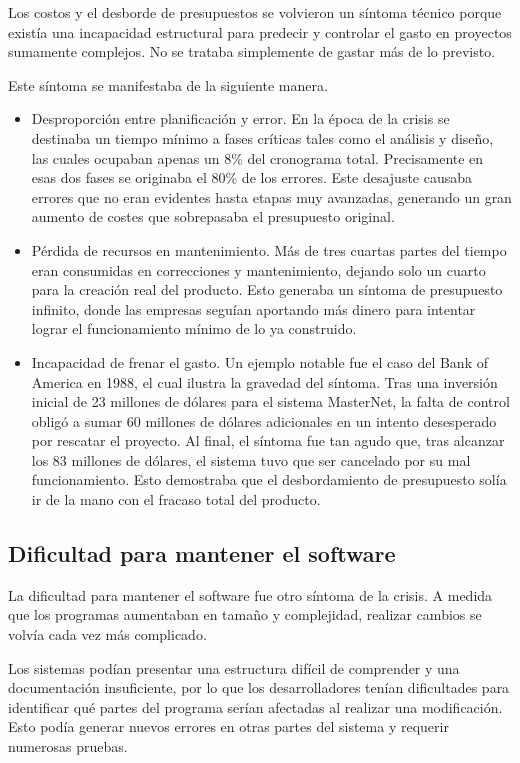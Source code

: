 \documentclass{./plantilla/umss}
\begin{document}
Los costos y el desborde de presupuestos se volvieron un síntoma técnico porque existía una incapacidad estructural para predecir y controlar el gasto en proyectos sumamente complejos. No se trataba simplemente de gastar más de lo previsto.

Este síntoma se manifestaba de la siguiente manera.

\begin{itemize}
    \item Desproporción entre planificación y error. En la época de la crisis se destinaba un tiempo mínimo a fases críticas tales como el análisis y diseño, las cuales ocupaban apenas un 8\% del cronograma total. Precisamente en esas dos fases se originaba el 80\% de los errores. Este desajuste causaba errores que no eran evidentes hasta etapas muy avanzadas, generando un gran aumento de costes que sobrepasaba el presupuesto original.
    \item Pérdida de recursos en mantenimiento. Más de tres cuartas partes del tiempo eran consumidas en correcciones y mantenimiento, dejando solo un cuarto para la creación real del producto. Esto generaba un síntoma de presupuesto infinito, donde las empresas seguían aportando más dinero para intentar lograr el funcionamiento mínimo de lo ya construido.
    \item Incapacidad de frenar el gasto. Un ejemplo notable fue el caso del Bank of America en 1988, el cual ilustra la gravedad del síntoma. Tras una inversión inicial de 23 millones de dólares para el sistema MasterNet, la falta de control obligó a sumar 60 millones de dólares adicionales en un intento desesperado por rescatar el proyecto. Al final, el síntoma fue tan agudo que, tras alcanzar los 83 millones de dólares, el sistema tuvo que ser cancelado por su mal funcionamiento. Esto demostraba que el desbordamiento de presupuesto solía ir de la mano con el fracaso total del producto.
\end{itemize}

\subsection{Dificultad para mantener el software}

La dificultad para mantener el software fue otro síntoma de la crisis. A medida que los programas aumentaban en tamaño y complejidad, realizar cambios se volvía cada vez más complicado.

Los sistemas podían presentar una estructura difícil de comprender y una documentación insuficiente, por lo que los desarrolladores tenían dificultades para identificar qué partes del programa serían afectadas al realizar una modificación. Esto podía generar nuevos errores en otras partes del sistema y requerir numerosas pruebas.
\end{document}
